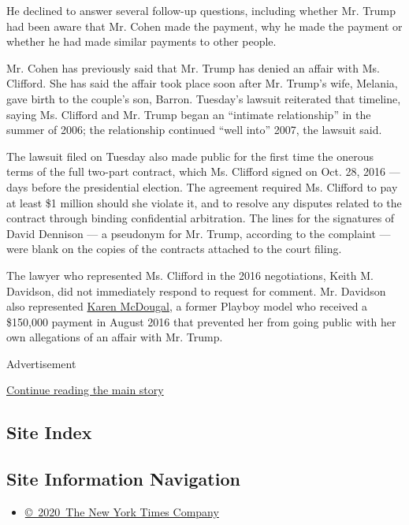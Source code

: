 He declined to answer several follow-up questions, including whether Mr.
Trump had been aware that Mr. Cohen made the payment, why he made the
payment or whether he had made similar payments to other people.

Mr. Cohen has previously said that Mr. Trump has denied an affair with
Ms. Clifford. She has said the affair took place soon after Mr. Trump's
wife, Melania, gave birth to the couple's son, Barron. Tuesday's lawsuit
reiterated that timeline, saying Ms. Clifford and Mr. Trump began an
``intimate relationship'' in the summer of 2006; the relationship
continued ``well into'' 2007, the lawsuit said.

The lawsuit filed on Tuesday also made public for the first time the
onerous terms of the full two-part contract, which Ms. Clifford signed
on Oct. 28, 2016 --- days before the presidential election. The
agreement required Ms. Clifford to pay at least \$1 million should she
violate it, and to resolve any disputes related to the contract through
binding confidential arbitration. The lines for the signatures of David
Dennison --- a pseudonym for Mr. Trump, according to the complaint ---
were blank on the copies of the contracts attached to the court filing.

The lawyer who represented Ms. Clifford in the 2016 negotiations, Keith
M. Davidson, did not immediately respond to request for comment. Mr.
Davidson also represented
\href{https://www.nytimes3xbfgragh.onion/2018/02/16/us/trump-mcdougal-playboy-model.html}{Karen
McDougal}, a former Playboy model who received a \$150,000 payment in
August 2016 that prevented her from going public with her own
allegations of an affair with Mr. Trump.

Advertisement

\protect\hyperlink{after-bottom}{Continue reading the main story}

\hypertarget{site-index}{%
\subsection{Site Index}\label{site-index}}

\hypertarget{site-information-navigation}{%
\subsection{Site Information
Navigation}\label{site-information-navigation}}

\begin{itemize}
\tightlist
\item
  \href{https://help.nytimes3xbfgragh.onion/hc/en-us/articles/115014792127-Copyright-notice}{©~2020~The
  New York Times Company}
\end{itemize}


